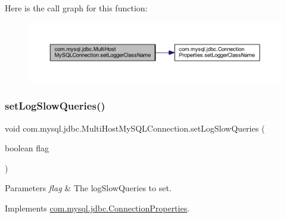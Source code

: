 Here is the call graph for this function\+:
\nopagebreak
\begin{figure}[H]
\begin{center}
\leavevmode
\includegraphics[width=350pt]{classcom_1_1mysql_1_1jdbc_1_1_multi_host_my_s_q_l_connection_a2d01c838ac3a65f71743aaa28f220ed0_cgraph}
\end{center}
\end{figure}
\mbox{\label{classcom_1_1mysql_1_1jdbc_1_1_multi_host_my_s_q_l_connection_a89d164c3f8f46d2f95ec2b1eae60e344}} 
\subsubsection{\texorpdfstring{set\+Log\+Slow\+Queries()}{setLogSlowQueries()}}
{\footnotesize\ttfamily void com.\+mysql.\+jdbc.\+Multi\+Host\+My\+S\+Q\+L\+Connection.\+set\+Log\+Slow\+Queries (\begin{DoxyParamCaption}\item[{boolean}]{flag }\end{DoxyParamCaption})}


\begin{DoxyParams}{Parameters}
{\em flag} & The log\+Slow\+Queries to set. \\
\hline
\end{DoxyParams}


Implements \mbox{\hyperlink{interfacecom_1_1mysql_1_1jdbc_1_1_connection_properties_a7dd83438187fa5956f663b84a604dce3}{com.\+mysql.\+jdbc.\+Connection\+Properties}}.

